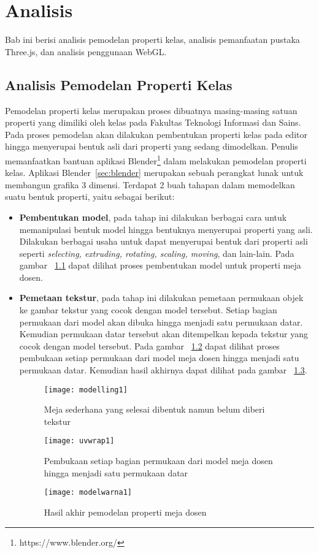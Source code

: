 \chapter{Analisis}
\label{chap:analisis}
Bab ini berisi analisis pemodelan properti kelas, analisis pemanfaatan pustaka Three.js, dan analisis penggunaan WebGL.

\section{Analisis Pemodelan Properti Kelas}
\label{sec:pemodelanproperti}
Pemodelan properti kelas merupakan proses dibuatnya masing-masing satuan properti yang dimiliki oleh kelas pada Fakultas Teknologi Informasi dan Sains. Pada proses pemodelan akan dilakukan pembentukan properti kelas pada editor hingga menyerupai bentuk asli dari properti yang sedang dimodelkan. Penulis memanfaatkan bantuan aplikasi Blender\footnote[1]{https://www.blender.org/} dalam melakukan pemodelan properti kelas. Aplikasi Blender~\ref{sec:blender} merupakan sebuah perangkat lunak untuk membangun grafika 3 dimensi. Terdapat 2 buah tahapan dalam memodelkan suatu bentuk properti, yaitu sebagai berikut:
\begin{itemize}
	\item {\bf Pembentukan model}, pada tahap ini dilakukan berbagai cara untuk memanipulasi bentuk model hingga bentuknya menyerupai properti yang asli. Dilakukan berbagai usaha untuk dapat menyerupai bentuk dari properti asli seperti {\it selecting, extruding, rotating, scaling, moving}, dan lain-lain. Pada gambar ~\ref{fig:modelling1} dapat dilihat proses pembentukan model untuk properti meja dosen.
	\item {\bf Pemetaan tekstur}, pada tahap ini dilakukan pemetaan permukaan objek ke gambar tekstur yang cocok dengan model tersebut. Setiap bagian permukaan dari model akan dibuka hingga menjadi satu permukaan datar. Kemudian permukaan datar tersebut akan ditempelkan kepada tekstur yang cocok dengan model tersebut. Pada gambar ~\ref{fig:uvwrap1} dapat dilihat proses pembukaan setiap permukaan dari model meja dosen hingga menjadi satu permukaan datar. Kemudian hasil akhirnya dapat dilihat pada gambar ~\ref{fig:modelwarna1}.
	\begin{figure}
		\centering
		\texttt{[image: modelling1]}
		\caption{Meja sederhana yang selesai dibentuk namun belum diberi tekstur}
		\label{fig:modelling1}
	\end{figure}
	\begin{figure}
		\centering
		\texttt{[image: uvwrap1]}
		\caption{Pembukaan setiap bagian permukaan dari model meja dosen hingga menjadi satu permukaan datar}
		\label{fig:uvwrap1}
	\end{figure}
	\begin{figure}
		\centering
		\texttt{[image: modelwarna1]}
		\caption{Hasil akhir pemodelan properti meja dosen}
		\label{fig:modelwarna1}
	\end{figure}
\end{itemize}

